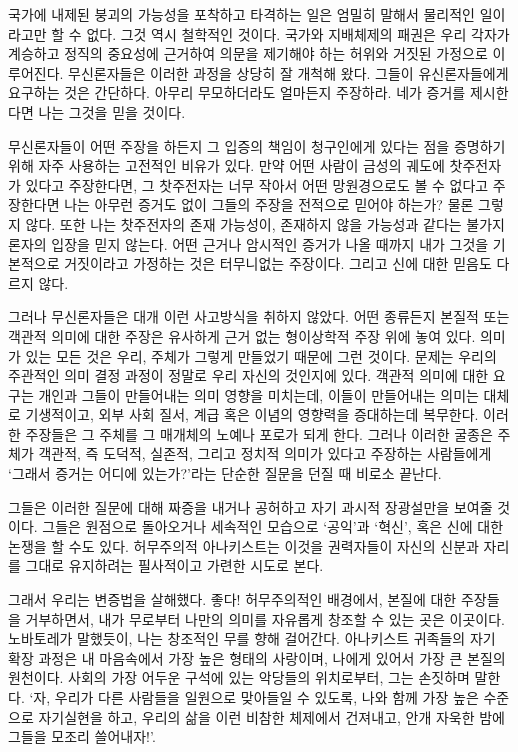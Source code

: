 \documentclass[10pt, b6paper, openany]{memoir}
\begin{document}
\begin{article}
국가에 내제된 붕괴의 가능성을 포착하고 타격하는 일은 엄밀히 말해서 물리적인 일이라고만 할 수 없다. 그것 역시 철학적인 것이다. 국가와 지배체제의 패권은 우리 각자가 계승하고 정직의 중요성에 근거하여 의문을 제기해야 하는 허위와 거짓된 가정으로 이루어진다. 무신론자들은 이러한 과정을 상당히 잘 개척해 왔다. 그들이 유신론자들에게 요구하는 것은 간단하다. 아무리 무모하더라도 얼마든지 주장하라. 네가 증거를 제시한다면 나는 그것을 믿을 것이다. 

무신론자들이 어떤 주장을 하든지 그 입증의 책임이 청구인에게 있다는 점을 증명하기 위해 자주 사용하는 고전적인 비유가 있다. 만약 어떤 사람이 금성의 궤도에 찻주전자가 있다고 주장한다면, 그 찻주전자는 너무 작아서 어떤 망원경으로도 볼 수 없다고 주장한다면 나는 아무런 증거도 없이 그들의 주장을 전적으로 믿어야 하는가? 물론 그렇지 않다. 또한 나는 찻주전자의 존재 가능성이, 존재하지 않을 가능성과 같다는 불가지론자의 입장을 믿지 않는다. 어떤 근거나 암시적인 증거가 나올 때까지 내가 그것을 기본적으로 거짓이라고 가정하는 것은 터무니없는 주장이다. 그리고 신에 대한 믿음도 다르지 않다. 

그러나 무신론자들은 대개 이런 사고방식을 취하지 않았다. 어떤 종류든지 본질적 또는 객관적 의미에 대한 주장은 유사하게 근거 없는 형이상학적 주장 위에 놓여 있다. 의미가 있는 모든 것은 우리, 주체가 그렇게 만들었기 때문에 그런 것이다. 문제는 우리의 주관적인 의미 결정 과정이 정말로 우리 자신의 것인지에 있다. 객관적 의미에 대한 요구는 개인과 그들이 만들어내는 의미 영향을 미치는데, 이들이 만들어내는 의미는 대체로 기생적이고, 외부 사회 질서, 계급 혹은 이념의 영향력을 증대하는데 복무한다. 이러한 주장들은 그 주체를 그 매개체의 노예나 포로가 되게 한다. 그러나 이러한 굴종은 주체가 객관적, 즉 도덕적, 실존적, 그리고 정치적 의미가 있다고 주장하는 사람들에게 `그래서 증거는 어디에 있는가?'라는 단순한 질문을 던질 때 비로소 끝난다.

그들은 이러한 질문에 대해 짜증을 내거나 공허하고 자기 과시적 장광설만을 보여줄 것이다. 그들은 원점으로 돌아오거나 세속적인 모습으로 `공익'과 `혁신', 혹은 신에 대한 논쟁을 할 수도 있다. 허무주의적 아나키스트는 이것을 권력자들이 자신의 신분과 자리를 그대로 유지하려는 필사적이고 가련한 시도로 본다. 

그래서 우리는 변증법을 살해했다. 좋다! 허무주의적인 배경에서, 본질에 대한 주장들을 거부하면서, 내가 무로부터 나만의 의미를 자유롭게 창조할 수 있는 곳은 이곳이다. 노바토레가 말했듯이, 나는 창조적인 무를 향해 걸어간다. 아나키스트 귀족들의 자기 확장 과정은 내 마음속에서 가장 높은 형태의 사랑이며, 나에게 있어서 가장 큰 본질의 원천이다. 사회의 가장 어두운 구석에 있는 악당들의 위치로부터, 그는 손짓하며 말한다. `자, 우리가 다른 사람들을 일원으로 맞아들일 수 있도록, 나와 함께 가장 높은 수준으로 자기실현을 하고, 우리의 삶을 이런 비참한 체제에서 건져내고, 안개 자욱한 밤에 그들을 모조리 쓸어내자!'. 


\end{article}
\end{document}
